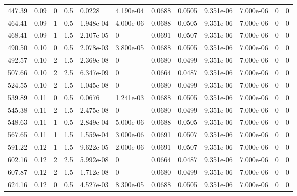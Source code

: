 \documentclass[preview]{standalone}
\begin{document}
{{\begin{tabular}{L{1.2cm}C{1.2cm} C{0.3cm}C{0.5cm} C{1.4cm}C{1.4cm} C{1.4cm}C{1.4cm} C{1.6cm}C{1.6cm} C{1.6cm}C{1.6cm}}
  447.39  &  0.09  & 0     & 0.5 &  0.0228  & 4.190e-04  &  0.0688&   0.0505& 9.351e-06 & 7.000e-06   &  0 & 0  \\ 
  464.41  &  0.09  & 1     & 0.5 &  1.948e-04  & 4.000e-06  &  0.0688&   0.0505& 9.351e-06 & 7.000e-06   &  0 & 0  \\ 
  468.41  &  0.09  & 1     & 1.5 &  2.107e-05  & 0  &  0.0691&   0.0507& 9.351e-06 & 7.000e-06   &  0 & 0  \\ 
  490.50  &  0.10  & 0     & 0.5 &  2.078e-03  & 3.800e-05  &  0.0688&   0.0505& 9.351e-06 & 7.000e-06   &  0 & 0  \\ 
  492.57  &  0.10  & 2     & 1.5 &  2.369e-08  & 0  &  0.0680&   0.0499& 9.351e-06 & 7.000e-06   &  0 & 0  \\ 
  507.66  &  0.10  & 2     & 2.5 &  6.347e-09  & 0  &  0.0664&   0.0487& 9.351e-06 & 7.000e-06   &  0 & 0  \\ 
  524.55  &  0.10  & 2     & 1.5 &  1.045e-08  & 0  &  0.0680&   0.0499& 9.351e-06 & 7.000e-06   &  0 & 0  \\ 
  539.89  &  0.11  & 0     & 0.5 &  0.0676  & 1.241e-03  &  0.0688&   0.0505& 9.351e-06 & 7.000e-06   &  0 & 0  \\ 
  545.38  &  0.11  & 2     & 1.5 &  2.475e-08  & 0  &  0.0680&   0.0499& 9.351e-06 & 7.000e-06   &  0 & 0  \\ 
  548.63  &  0.11  & 1     & 0.5 &  2.849e-04  & 5.000e-06  &  0.0688&   0.0505& 9.351e-06 & 7.000e-06   &  0 & 0  \\ 
  567.65  &  0.11  & 1     & 1.5 &  1.559e-04  & 3.000e-06  &  0.0691&   0.0507& 9.351e-06 & 7.000e-06   &  0 & 0  \\ 
  591.22  &  0.12  & 1     & 1.5 &  9.622e-05  & 2.000e-06  &  0.0691&   0.0507& 9.351e-06 & 7.000e-06   &  0 & 0  \\ 
  602.16  &  0.12  & 2     & 2.5 &  5.992e-08  & 0  &  0.0664&   0.0487& 9.351e-06 & 7.000e-06   &  0 & 0  \\ 
  607.87  &  0.12  & 2     & 1.5 &  1.712e-08  & 0  &  0.0680&   0.0499& 9.351e-06 & 7.000e-06   &  0 & 0  \\ 
  624.16  &  0.12  & 0     & 0.5 &  4.527e-03  & 8.300e-05  &  0.0688&   0.0505& 9.351e-06 & 7.000e-06   &  0 & 0  \\ 
\hline 
\end{tabular} 

}}
\end{document}
